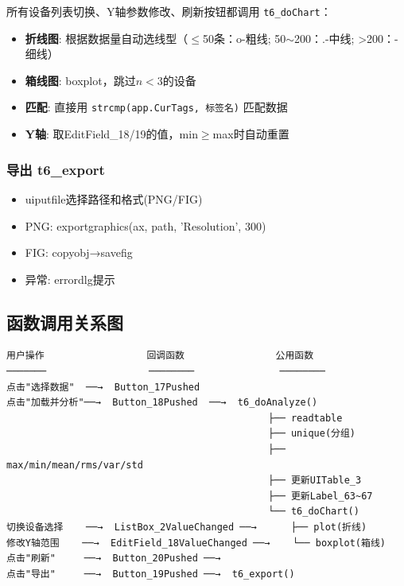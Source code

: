 \documentclass[12pt,a3paper]{ctexart}
\begin{document}
所有设备列表切换、Y轴参数修改、刷新按钮都调用 \texttt{t6\_doChart}：

\begin{itemize}
    \item \textbf{折线图}: 根据数据量自动选线型（$\le$50条：o-粗线; 50$\sim$200：.-中线; >200：-细线）
    \item \textbf{箱线图}: boxplot，跳过$n<3$的设备
    \item \textbf{匹配}: 直接用 \texttt{strcmp(app.CurTags, 标签名)} 匹配数据
    \item \textbf{Y轴}: 取EditField\_18/19的值，min$\ge$max时自动重置
\end{itemize}

\subsubsection{导出 t6\_export}

\begin{itemize}
    \item uiputfile选择路径和格式(PNG/FIG)
    \item PNG: exportgraphics(ax, path, 'Resolution', 300)
    \item FIG: copyobj→savefig
    \item 异常: errordlg提示
\end{itemize}

\subsection{函数调用关系图}

\begin{verbatim}
用户操作                  回调函数                公用函数
───────                  ────────               ────────
点击"选择数据"  ──→  Button_17Pushed
点击"加载并分析"──→  Button_18Pushed  ──→  t6_doAnalyze()
                                              ├── readtable
                                              ├── unique(分组)
                                              ├── max/min/mean/rms/var/std
                                              ├── 更新UITable_3
                                              ├── 更新Label_63~67
                                              └── t6_doChart()
切换设备选择    ──→  ListBox_2ValueChanged ──→      ├── plot(折线)
修改Y轴范围    ──→  EditField_18ValueChanged ──→    └── boxplot(箱线)
点击"刷新"     ──→  Button_20Pushed ──→
点击"导出"     ──→  Button_19Pushed ──→  t6_export()
\end{verbatim}
\end{document}
